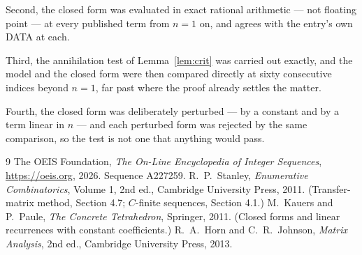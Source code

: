 \documentclass[11pt,a4paper]{article}
\theoremstyle{plain}
\theoremstyle{definition}
\begin{document}
Second, the closed form was evaluated in exact rational arithmetic --- not floating point ---
at every published term from $n=1$ on, and agrees with the entry's own DATA at each.

Third, the annihilation test of Lemma~\ref{lem:crit} was carried out exactly, and the model
and the closed form were then compared directly at sixty consecutive indices beyond
$n=1$, far past where the proof already settles the matter.

Fourth, the closed form was deliberately perturbed --- by a constant and by a term linear in
$n$ --- and each perturbed form was rejected by the same comparison, so the test is not one
that anything would pass.

\begin{thebibliography}{9}
 The OEIS Foundation, \emph{The On-Line Encyclopedia of Integer
Sequences}, \url{https://oeis.org}, 2026. Sequence A227259.
 R.~P.~Stanley, \emph{Enumerative Combinatorics}, Volume 1, 2nd ed.,
Cambridge University Press, 2011. (Transfer-matrix method, Section 4.7; $C$-finite sequences,
Section 4.1.)
 M.~Kauers and P.~Paule, \emph{The Concrete Tetrahedron}, Springer, 2011.
(Closed forms and linear recurrences with constant coefficients.)
 R.~A.~Horn and C.~R.~Johnson, \emph{Matrix Analysis}, 2nd ed., Cambridge
University Press, 2013.
\end{thebibliography}
\end{document}
